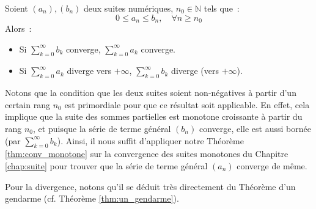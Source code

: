 \begin{boxdef}
Soient $(a_n), (b_n)$ deux suites numériques, $n_0 \in \mathbb{N}$ tels que~:
\begin{equation}
0 \leq a_n \leq b_n, \quad \forall n \geq n_0
\end{equation}
Alors~:
\begin{itemize}
    \item Si $\displaystyle\sum_{k=0}^{\infty} b_k$ converge, $\displaystyle\sum_{k=0}^{\infty} a_k$ converge.
    \item Si $\displaystyle\sum_{k=0}^{\infty} a_k$ diverge vers $+\infty$, $\displaystyle\sum_{k=0}^{\infty} b_k$ diverge (vers $+\infty$).
\end{itemize}
\end{boxdef}
Notons que la condition que les deux suites soient non-négatives à partir d'un certain rang $n_0$ est primordiale pour que ce résultat soit applicable. En effet, cela implique que la suite des sommes partielles est monotone croissante à partir du rang $n_0$, et puisque la série de terme général $(b_n)$ converge, elle est aussi bornée (par $\displaystyle\sum_{k = 0}^{\infty} b_k$). Ainsi, il nous suffit d'appliquer notre Théorème \ref{thm:conv_monotone} sur la convergence des suites monotones du Chapitre \ref{chap:suite} pour trouver que la série de terme général $(a_n)$ converge de même.

Pour la divergence, notons qu'il se déduit très directement du Théorème d'un gendarme (cf. Théorème \ref{thm:un_gendarme}).


    
